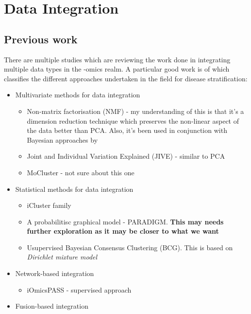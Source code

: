
\section{Data Integration}

\subsection{Previous work}

There are multiple studies \citet{Menyhart2021-ef, Subramanian2020-tk, Picard2021-qr, Reel2021-sg} which are reviewing the work done in integrating multiple data types in the -omics realm. A particular good work is of \citet{Menyhart2021-ef} which classifies the different approaches undertaken in the field for disease stratification:
\begin{itemize}
    \item Multivariate methods for data integration
        \begin{itemize}
            \item Non-matrix factorisation (NMF) - my understanding of this is that it's a dimension reduction technique which preserves the non-linear aspect of the data better than PCA. Also, it's been used in conjunction with Bayesian approaches by \citet{Robertson2017-mg}
            \item Joint and Individual Variation Explained (JIVE) - similar to PCA
            \item MoCluster \cite{Meng2016-ui} - not sure about this one
        \end{itemize}
    \item Statistical methods for data integration
        \begin{itemize}
            \item iCluster family \citet{Shen2009-ew, Shen2012-yj, Mo2018-el}
            \item A probabilitisc graphical model - PARADIGM. \textbf{This may needs further exploration as it may be closer to what we want}
            \item Usupervised Bayesian Consensus Clustering (BCG). This is based on \textit{Dirichlet mixture model}
        \end{itemize}
    \item Network-based integration
        \begin{itemize}
            \item iOmicsPASS - supervised approach
        \end{itemize}
    \item Fusion-based integration

\end{itemize}

